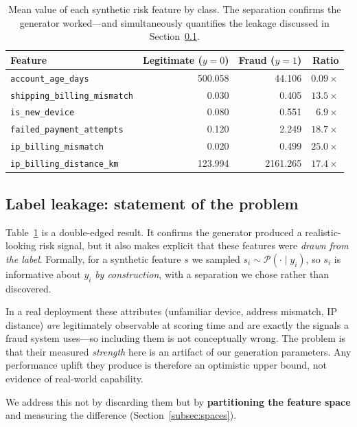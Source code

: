 \documentclass{article}
\begin{document}
\begin{table}[H]
\centering
\caption{Mean value of each synthetic risk feature by class. The
separation confirms the generator worked---and simultaneously
quantifies the leakage discussed in Section~\ref{subsec:leakage}.}
\label{tab:sanity}
\begin{tabular}{lrrr}
\toprule
Feature & Legitimate ($y{=}0$) & Fraud ($y{=}1$) & Ratio \\
\midrule
\texttt{account\_age\_days}          & 500.058 & 44.106   & $0.09\times$ \\
\texttt{shipping\_billing\_mismatch} & 0.030   & 0.405    & $13.5\times$ \\
\texttt{is\_new\_device}             & 0.080   & 0.551    & $6.9\times$ \\
\texttt{failed\_payment\_attempts}   & 0.120   & 2.249    & $18.7\times$ \\
\texttt{ip\_billing\_mismatch}       & 0.020   & 0.499    & $25.0\times$ \\
\texttt{ip\_billing\_distance\_km}   & 123.994 & 2161.265 & $17.4\times$ \\
\bottomrule
\end{tabular}
\end{table}

\subsection{Label leakage: statement of the problem}
\label{subsec:leakage}
Table~\ref{tab:sanity} is a double-edged result. It confirms the
generator produced a realistic-looking risk signal, but it also makes
explicit that these features were \emph{drawn from the label}. Formally,
for a synthetic feature $s$ we sampled
$s_i \sim \mathcal{P}(\cdot \mid y_i)$, so $s_i$ is informative about
$y_i$ \emph{by construction}, with a separation we chose rather than
discovered.

In a real deployment these attributes (unfamiliar device, address
mismatch, IP distance) \emph{are} legitimately observable at scoring
time and are exactly the signals a fraud system uses---so including
them is not conceptually wrong. The problem is that their measured
\emph{strength} here is an artifact of our generation parameters. Any
performance uplift they produce is therefore an optimistic upper bound,
not evidence of real-world capability.

We address this not by discarding them but by \textbf{partitioning the
feature space} and measuring the difference
(Section~\ref{subsec:spaces}).
\end{document}
